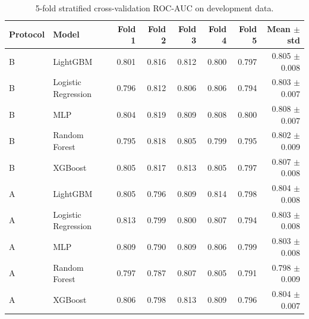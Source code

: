 \begin{table}[t]
\centering
\footnotesize
\caption{5-fold stratified cross-validation ROC-AUC on development data.}
\label{tab:cv}
\begin{tabular}{llrrrrrr}
\toprule
Protocol & Model & Fold 1 & Fold 2 & Fold 3 & Fold 4 & Fold 5 & Mean $\pm$ std \\
\midrule
B & LightGBM & 0.801 & 0.816 & 0.812 & 0.800 & 0.797 & 0.805 $\pm$ 0.008 \\
B & Logistic Regression & 0.796 & 0.812 & 0.806 & 0.806 & 0.794 & 0.803 $\pm$ 0.007 \\
B & MLP & 0.804 & 0.819 & 0.809 & 0.808 & 0.800 & 0.808 $\pm$ 0.007 \\
B & Random Forest & 0.795 & 0.818 & 0.805 & 0.799 & 0.795 & 0.802 $\pm$ 0.009 \\
B & XGBoost & 0.805 & 0.817 & 0.813 & 0.805 & 0.797 & 0.807 $\pm$ 0.008 \\
A & LightGBM & 0.805 & 0.796 & 0.809 & 0.814 & 0.798 & 0.804 $\pm$ 0.008 \\
A & Logistic Regression & 0.813 & 0.799 & 0.800 & 0.807 & 0.794 & 0.803 $\pm$ 0.008 \\
A & MLP & 0.809 & 0.790 & 0.809 & 0.806 & 0.799 & 0.803 $\pm$ 0.008 \\
A & Random Forest & 0.797 & 0.787 & 0.807 & 0.805 & 0.791 & 0.798 $\pm$ 0.009 \\
A & XGBoost & 0.806 & 0.798 & 0.813 & 0.809 & 0.796 & 0.804 $\pm$ 0.007 \\
\bottomrule
\end{tabular}
\end{table}
